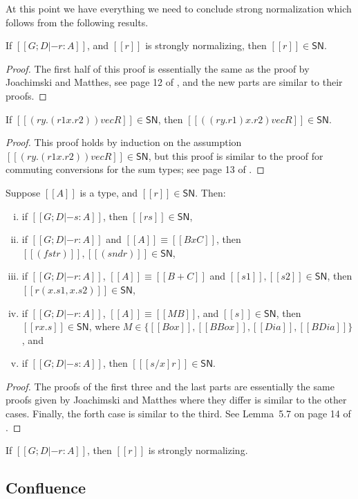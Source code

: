 At this point we have everything we need to conclude strong
normalization which follows from the following results.
\begin{lemma}
  \label{lemma:all_strongly_normalizing_terms_are_in_SN}
  If $[[G;D |- r : A]]$, and $[[r]]$ is strongly normalizing, then $[[r]] \in \mathsf{SN}$.
\end{lemma}
\begin{proof}
  The first half of this proof is essentially the same as the proof by
  Joachimski and Matthes, see page 12 of \cite{Joachimski:2003}, and
  the new parts are similar to their proofs.
\end{proof}

\begin{lemma}
  \label{lemma:commuting_conversions_in_SN}
  If $[[(r y.(r1 x.r2)) vec R]] \in \mathsf{SN}$, then $[[((r y.r1) x.r2) vec R]] \in \mathsf{SN}$.
\end{lemma}
\begin{proof}
  This proof holds by induction on the assumption $[[(r y.(r1 x.r2))
      vec R]] \in \mathsf{SN}$, but this proof is similar to the proof
  for commuting conversions for the sum types; see page 13 of
  \cite{Joachimski:2003}.
\end{proof}

\begin{lemma}
  \label{lemma:typable_eliminations_are_in_SN}
  Suppose $[[A]]$ is a type, and $[[r]] \in \mathsf{SN}$.  Then:
  \begin{enumerate}[i.]
  \item if $[[G;D |- s : A]]$, then $[[r s]] \in \mathsf{SN}$,
  \item if $[[G;D |- r : A]]$ and $[[A]] \equiv [[B x C]]$, then $[[(fst r)]],[[(snd r)]] \in \mathsf{SN}$,
  \item if $[[G;D |- r : A]]$, $[[A]] \equiv [[B + C]]$ and $[[s1]],[[s2]] \in \mathsf{SN}$,
    then $[[r (x.s1,x.s2)]] \in \mathsf{SN}$,
  \item if $[[G;D |- r : A]]$, $[[A]] \equiv [[M B]]$, and $[[s]] \in \mathsf{SN}$, then $[[r x.s]] \in \mathsf{SN}$,
    where $M \in \{[[Box]], [[BBox]], [[Dia]], [[BDia]] \}$, and
  \item if $[[G;D |- s : A]]$, then $[[ [s/x]r]] \in \mathsf{SN}$.
  \end{enumerate}
\end{lemma}
\begin{proof}
  The proofs of the first three and the last parts are essentially the
  same proofs given by Joachimski and Matthes where they differ is
  similar to the other cases.  Finally, the forth case is similar to
  the third. See Lemma~5.7 on page 14 of \cite{Joachimski:2003}.
\end{proof}

\begin{corollary}
  \label{corollary:strong_normalization}
  If $[[G;D |- r : A]]$, then $[[r]]$ is strongly normalizing.
\end{corollary}

\subsection{Confluence}
\label{subsec:confluence}

